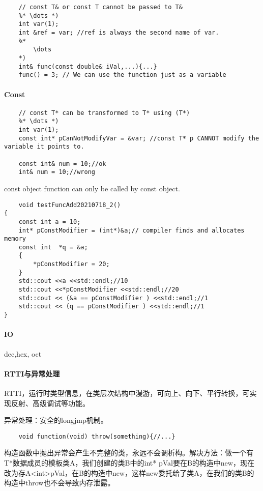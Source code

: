 \documentclass[UTF8]{../computerUniverse}
\begin{document}
\begin{lstlisting}
    // const T& or const T cannot be passed to T&
    %* \dots *)
    int var(1);
    int &ref = var; //ref is always the second name of var.
    %*
        \dots
    *)
    int& func(const double& iVal,...){...}
    func() = 3; // We can use the function just as a variable
\end{lstlisting}

 
\paragraph{Const}

\begin{lstlisting}
    // const T* can be transformed to T* using (T*)
    %* \dots *)
    int var(1);
    const int* pCanNotModifyVar = &var; //const T* p CANNOT modify the variable it points to.

    const int& num = 10;//ok
    int& num = 10;//wrong
\end{lstlisting}
const object function can only be called by const object.\\

\begin{lstlisting}
    void testFuncAdd20210718_2()
{
    const int a = 10;
	int* pConstModifier = (int*)&a;// compiler finds and allocates memory
	const int  *q = &a;
	{
		*pConstModifier = 20;
	}
	std::cout <<a <<std::endl;//10
	std::cout <<*pConstModifier <<std::endl;//20
	std::cout << (&a == pConstModifier ) <<std::endl;//1
	std::cout << (q == pConstModifier ) <<std::endl;//1
}
\end{lstlisting}



\paragraph{IO}

dec,hex, oct

\paragraph{RTTI与异常处理}
RTTI，运行时类型信息，在类层次结构中漫游，可向上、向下、平行转换，可实现反射、高级调试等功能。

异常处理：安全的longjmp机制。
\begin{lstlisting}
    void function(void) throw(something){//...}
\end{lstlisting}
构造函数中抛出异常会产生不完整的类，永远不会调析构。解决方法：做一个有T*数据成员的模板类A，我们创建的类B中的int* pVal要在B的构造中new，现在改为存A<int>pVal，在B的构造中new，这样new委托给了类A，在我们的类B的构造中throw也不会导致内存泄露。
\end{document}
